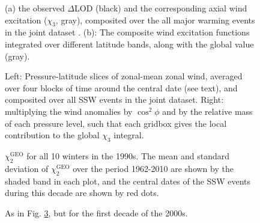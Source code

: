 \documentclass[draft,jgrga]{agutex}
\begin{document}
 
\begin{figure}
  \noindent
   \caption{ (a) the observed $\Delta$LOD (black) and the corresponding axial wind excitation ($\chi_3$, gray), composited over  {the all major warming events in the joint dataset} . (b): The composite wind excitation functions integrated over different latitude bands, along with the global value (gray). }
   \label{fig:composites_X3}
 \end{figure}

\begin{figure}
  \noindent
   \caption{ Left: Pressure-latitude slices of zonal-mean zonal wind, averaged over four blocks of time around the central date (see text), and composited over all SSW events in the joint dataset.  Right: multiplying the wind anomalies by $\cos^2 \phi$ and by the relative mass of each pressure level, such that each gridbox gives the local contribution to the global $\chi_3$ integral.
}
   \label{fig:wind_anomaly_composites}
 \end{figure}



\begin{figure}
  \noindent
   \caption{$\chi_2^{\text{GEO}}$ for all 10 winters in the 1990s.  The mean and standard deviation of $\chi_2^{\text{GEO}}$ over the period 1962-2010 are shown by the shaded band in each plot, and the central dates of the  SSW events during this decade are shown by red dots.}
   \label{fig:X2_1990s}
 \end{figure}


\begin{figure}
  \noindent
   \caption{As in Fig. \ref{fig:X2_1990s}, but for the first decade of the 2000s.  }
   \label{fig:X2_2000s}
 \end{figure}



%
%

%
%
%
%
%
%


\end{document}
